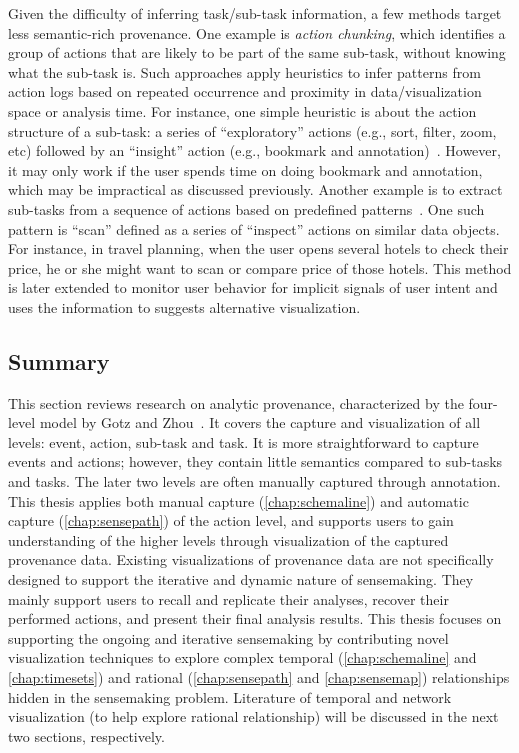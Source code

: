 Given the difficulty of inferring task/sub-task information, a few methods target less semantic-rich provenance. One example is \emph{action chunking}, which identifies a group of actions that are likely to be part of the same sub-task, without knowing what the sub-task is. Such approaches apply heuristics to infer patterns from action logs based on repeated occurrence and proximity in data/visualization space or analysis time. For instance, one simple heuristic is about the action structure of a sub-task: a series of ``exploratory'' actions (e.g., sort, filter, zoom, etc) followed by an ``insight'' action (e.g., bookmark and annotation)~\cite{Gotz2009}. However, it may only work if the user spends time on doing bookmark and annotation, which may be impractical as discussed previously. Another example is to extract sub-tasks from a sequence of actions based on predefined patterns~\cite{Gotz2009b}. One such pattern is ``scan'' defined as a series of ``inspect'' actions on similar data objects. For instance, in travel planning, when the user opens several hotels to check their price, he or she might want to scan or compare price of those hotels. This method is later extended to monitor user behavior for implicit signals of user intent and uses the information to suggests alternative visualization. 

\subsection{Summary}
This section reviews research on analytic provenance, characterized by the four-level model by Gotz and Zhou~\cite{Gotz2009}. It covers the capture and visualization of all levels: event, action, sub-task and task. It is more straightforward to capture events and actions; however, they contain little semantics compared to sub-tasks and tasks. The later two levels are often manually captured through annotation. This thesis applies both manual capture (\autoref{chap:schemaline}) and automatic capture  (\autoref{chap:sensepath}) of the action level, and supports users to gain understanding of the higher levels through visualization of the captured provenance data. Existing visualizations of provenance data are not specifically designed to support the iterative and dynamic nature of sensemaking. They mainly support users to recall and replicate their analyses, recover their performed actions, and present their final analysis results. This thesis focuses on supporting the ongoing and iterative sensemaking by contributing novel visualization techniques to explore complex temporal (\autoref{chap:schemaline} and \autoref{chap:timesets}) and rational (\autoref{chap:sensepath} and \autoref{chap:sensemap}) relationships hidden in the sensemaking problem. Literature of temporal and network visualization (to help explore rational relationship) will be discussed in the next two sections, respectively.